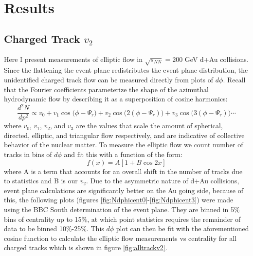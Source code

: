 
\chapter{Results} %
\section{Charged Track $v_{2}$}
Here I present measurements of elliptic flow in $\sqrt{s_{NN}}=200$ GeV d+Au collisions. Since the flattening the event plane redistributes the event plane distribution, the unidentified charged track flow can be measured directly from plots of $d\phi$. Recall that the Fourier coefficients parameterize the shape of the azimuthal hydrodynamic flow by describing it as a superposition of cosine harmonics:
\begin{equation}
\frac{d^{2}N}{dp^{2}} \propto v_0 + v_1 \cos\big(\phi - \Psi_{r}\big) + v_2 \cos\big(2(\phi - \Psi_{r})\big) + v_3 \cos\big(3(\phi - \Psi_{r})\big) \cdots
\end{equation}
where $v_0$, $v_1$, $v_2$, and $v_3$ are the values that scale the amount of spherical, directed, elliptic, and triangular flow respectively, and are indicative of collective behavior of the nuclear matter. To measure the elliptic flow we count number of tracks in bins of $d\phi$ and fit this with a function of the form:
\begin{equation}
\label{v2fitfn}
f(x) = A [1 + B \cos 2x]
\end{equation}
where A is a term that accounts for an overall shift in the number of tracks due to statistics and B is our $v_2$. Due to the asymmetric nature of d+Au collisions, event plane calculations are significantly better on the Au going side, because of this, the following plots (figures \ref{fig:Ndphicent0}-\ref{fig:Ndphicent3}) were made using the BBC South determination of the event plane. They are binned in 5\% bins of centrality up to 15\%, at which point statistics requires the remainder of data to be binned 10\%-25\%. This $d\phi$ plot can then be fit with the aforementioned cosine function to calculate the elliptic flow measurements vs centrality for all charged tracks which is shown in figure \ref{fig:alltrackv2}.


